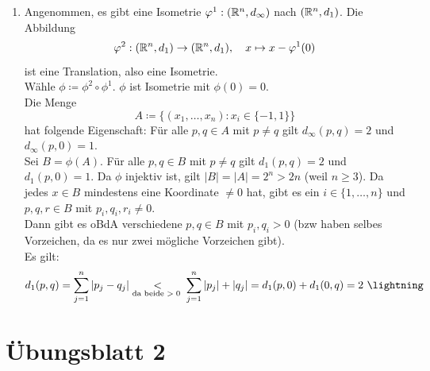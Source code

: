 \begin{solution}
\begin{enumerate}[label= (\alph*)]
    \item Angenommen, es gibt eine Isometrie \( \varphi^1: (\mathbb{R}^n, d_\infty) \) nach \( (\mathbb{R}^n, d_1) \). Die Abbildung
    \begin{equation*}
      \varphi^2 : (\mathbb{R}^n, d_1) \to (\mathbb{R}^n, d_1), \quad x \mapsto x - \varphi^1(0)
    \end{equation*}
    ist eine Translation, also eine Isometrie. \\
    Wähle \( \phi \coloneqq \phi^2 \circ \phi^1 \). \( \phi \) ist Isometrie mit \( \phi(0) = 0 \). \\
    Die Menge
    \begin{equation*}
      A \coloneqq \{ (x_1, \dots, x_n): x_i \in \{ -1, 1 \} \}
    \end{equation*}
    hat folgende Eigenschaft: Für alle \( p, q \in A \) mit \( p \neq q \) gilt \( d_\infty(p,q) = 2 \) und \( d_\infty(p, 0) = 1 \). \\
    Sei \( B = \phi(A) \). Für alle \( p,q \in B \) mit \( p \neq q \) gilt \( d_1(p,q) = 2 \) und \( d_1(p,0) = 1 \). Da \( \phi \) injektiv ist, gilt \( \vert B \vert = \vert A \vert = 2^n > 2n \) (weil \( n \geq 3 \)). Da jedes \( x \in B \) mindestens eine Koordinate \( \neq 0 \) hat, gibt es ein \( i \in \{ 1, \dots, n \} \) und \( p,q,r \in B \) mit \( p_i, q_i, r_i \neq 0 \). \\
    Dann gibt es oBdA verschiedene \( p,q \in B \) mit \( p_i, q_i > 0 \) (bzw haben selbes Vorzeichen, da es nur zwei mögliche Vorzeichen gibt). \\
    Es gilt:
    \begin{equation*}
      d_1(p,q) = \sum_{j = 1}^n \vert p_j - q_j \vert \underset{\text{da beide \( > 0 \) }}{<} \sum_{j = 1}^n \vert p_j \vert + \vert q_j \vert = d_1(p,0) + d_1(0,q) = 2 \ \lightning
    \end{equation*}
  \end{enumerate}
\end{solution}



% 
\section{Übungsblatt 2}
\setcounter{problemcounter}{0}

